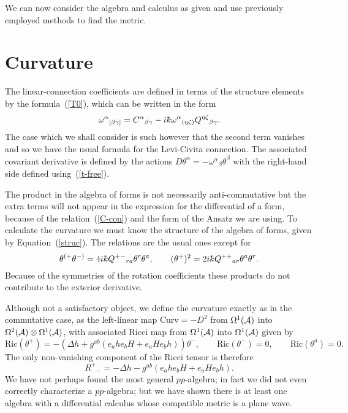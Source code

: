 \documentclass[12pt,a4paper]{article}
\newcounter{eg}
\def\c#1{{\cal #1}}
\def\kbar{{\mathchar'26\mkern-9muk}}
\newcommand{\initiate}{\setcounter{equation}{0}}
\begin{document}
We can now consider the algebra and calculus as given and use
previously employed methods to find the metric.

\initiate
\section{Curvature}                                         \label{curv}

The linear-connection coefficients are defined in terms of the
structure elements by the formula~(\ref{T0}), which can be written in
the form
$$
\omega^\alpha{}_{[\beta\gamma]} = C^\alpha{}_{\beta\gamma} - 
i\kbar \omega^\alpha{}_{(\eta\zeta)} Q^{\eta\zeta}{}_{\beta\gamma}.
$$
The case which we shall consider is such however that the second
term vanishes and so we have the usual formula for the Levi-Civita
connection.  The associated covariant derivative is defined by the
actions $D \theta^\alpha = - \omega^\alpha{}_\beta \theta^\beta$ with
the right-hand side defined using~(\ref{t-free}). 

The product in the algebra of forms is not necessarily
anti-commutative but the extra terms will not appear in the expression
for the differential of a form, because of the relation~(\ref{C-con})
and the form of the Ansatz we are using. To calculate the curvature we
must know the structure of the algebra of forms, given by
Equation~(\ref{struc}).  The relations are the usual ones except for
\begin{equation}
\theta^{(+}\theta^{-)} = 4i\kbar Q^{+-}{}_{ra} \theta^r\theta^a ,\qquad
(\theta^+)^2 = 2i\kbar  Q^{++}{}_{ar} \theta^a \theta^r.    \label{acr}
\end{equation}
Because of the symmetries of the rotation coefficients these products
do not contribute to the exterior derivative.

Although not a satisfactory object, we define the curvature exactly
as in the commutative case, as the left-linear map 
$\mbox{Curv} = - D^2$ from $\Omega^1(\c{A})$ into 
$\Omega^2(\c{A}) \otimes \Omega^1(\c{A})$, with associated Ricci map
from $\Omega^1(\c{A})$ into $\Omega^1(\c{A})$ given by
$$
\mbox{Ric} (\theta^+) = -(\Delta h + g^{ab} (e_a h e_b H + e_a H e_b h)) 
\theta^-, \qquad 
\mbox{Ric} (\theta^-) = 0, \qquad
\mbox{Ric} (\theta^a) = 0.
$$
The only
non-vanishing component of the Ricci tensor is therefore
$$
R^+{}_- = -\Delta h - g^{ab} (e_a h e_b H + e_a H e_b h).    %
$$ We have not perhaps found the most general $pp$-algebra; in fact we
did not even correctly characterize a $pp$-algebra; but we have shown
there is at least one algebra with a differential calculus whose
compatible metric is a plane wave.
\end{document}
